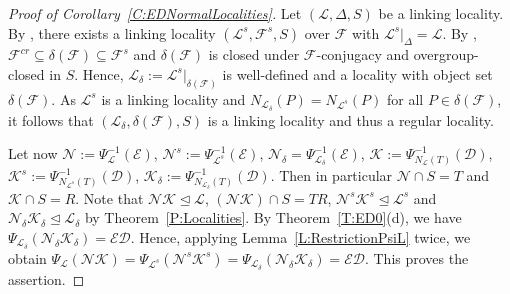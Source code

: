 \documentclass[reqno,11pt]{amsart}
\numberwithin{equation}{section}
\theoremstyle{definition}
\newcommand{\F}{\mathcal{F}}
\newcommand{\E}{\mathcal{E}}
\renewcommand{\L}{\mathcal{L}}
\newcommand{\N}{\mathcal{N}}
\newcommand{\K}{\mathcal{K}}
\newcommand{\mD}{\mathcal{D}}
\begin{document}
\begin{proof}[Proof of Corollary~\ref{C:EDNormalLocalities}]
Let $(\L,\Delta,S)$ be a linking locality. By \cite[Proposition~3.3, Theorem~7.2]{Henke:2015}, there exists a linking locality $(\L^s,\F^s,S)$ over $\F$ with $\L^s|_\Delta=\L$. By \cite[Lemma~10.4]{Henke:Regular},  $\F^{cr}\subseteq\delta(\F)\subseteq \F^s$ and $\delta(\F)$ is closed under $\F$-conjugacy and overgroup-closed in $S$. Hence, $\L_\delta:=\L^s|_{\delta(\F)}$ is well-defined and a locality with object set $\delta(\F)$. As $\L^s$ is a linking locality and $N_{\L_\delta}(P)=N_{\L^s}(P)$ for all $P\in\delta(\F)$, it follows that $(\L_\delta,\delta(\F),S)$ is a linking locality and thus a regular locality.

\smallskip

Let now $\N:=\Psi_\L^{-1}(\E)$, $\N^s:=\Psi_{\L^s}^{-1}(\E)$, $\N_\delta=\Psi_{\L_\delta}^{-1}(\E)$, $\K:=\Psi_{N_\L(T)}^{-1}(\mD)$, $\K^s:=\Psi_{N_{\L^s}(T)}^{-1}(\mD)$, $\K_\delta:=\Psi_{N_{\L_\delta}(T)}^{-1}(\mD)$. Then in particular $\N\cap S=T$ and $\K\cap S=R$. Note that $\N\K\unlhd\L$, $(\N\K)\cap S=TR$, $\N^s\K^s\unlhd\L^s$ and $\N_\delta\K_\delta\unlhd\L_\delta$ by Theorem~\ref{P:Localities}. By Theorem~\ref{T:ED0}(d), we have $\Psi_{\L_\delta}(\N_\delta\K_\delta)=\E\mD$. Hence, applying Lemma~\ref{L:RestrictionPsiL} twice, we obtain $\Psi_\L(\N\K)=\Psi_{\L^s}(\N^s\K^s)=\Psi_{\L_\delta}(\N_\delta\K_\delta)=\E\mD$. This proves the assertion.
\end{proof}








\end{document}
